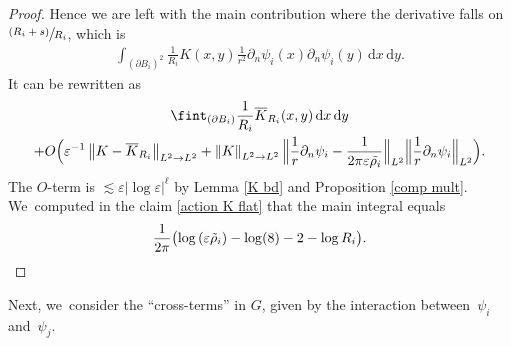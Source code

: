 \documentclass[10pt]{amsart}
\let\strokedint\fint
\let\epsilon\varepsilon
\newcommand{\psfrac}[2]{\sfrac{(#1)}{#2}}
\theoremstyle{definition}
\newcommand\norm[1]{\left\lVert #1\right\rVert}
\newcommand\Bnorm[1]{\Bigl\lVert #1\Bigr\rVert}
\newcommand\dd{\,\mathrm{d}}
\newcommand\dx{\dd x}
\newcommand\dy{\dd y}
\let\de\partial
\let\eps\epsilon
\begin{document}
\begin{proof}
Hence we are left with the main contribution where the derivative falls on $\psfrac{R_i+s}{R_i}$, which is
\begin{align*}
\int_{(\de B_i)^2}\frac{1}{R_i}K(x,y)\frac{1}{r^2}\de_n\psi_i(x)\de_n\psi_i(y)\dx\dy.
\end{align*}
It can be rewritten as
\begin{multline*}
\strokedint_{(\de B_i)}\frac{1}{R_i}\overline{K}_{R_i}(x,y)\dx\dy\\
+O\Bigl(\eps^{-1}\norm{K-\overline{K}_{R_i}}_{L^2\to L^2}+\norm{K}_{L^2\to L^2}\Bnorm{\frac{1}{r}\de_n\psi_i-\frac{1}{2\pi\eps\tilde{\rho_i}}}_{L^2}\Bnorm{\frac{1}{r}\de_n\psi_i}_{L^2}\Bigr).
\end{multline*}
The $O$-term is $\lesssim \eps|{\log\eps}|^\ell$ by Lemma \ref{K bd} and Proposition \ref{comp mult}. We~computed in the claim \eqref{action K flat} that the main integral equals
\[
\frac{1}{2\pi}\bigl(\log\left(\eps\tilde{\rho}_i\right)-\log(8)-2-\log R_i\bigr).\qedhere
\]
\end{proof}

Next, we~consider the ``cross-terms'' in $G$, given by the interaction between~$\psi_i$ and~$\psi_j$.
\end{document}
